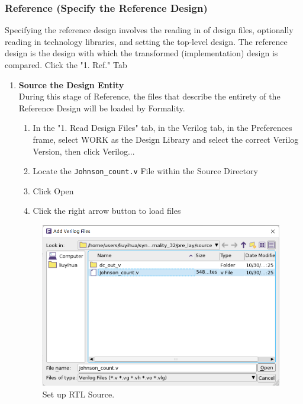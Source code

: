 \documentclass[a4paper,12pt,twoside]{article}
\begin{document}
\subsubsection{Reference (Specify the Reference Design)}
Specifying the reference design involves the reading in of design files, optionally reading in technology libraries, and setting the top-level design. The reference design is the design with which the transformed (implementation) design is compared. Click the "1. Ref." Tab
\begin{enumerate}
    \item \textbf{Source the Design Entity}\\
    During this stage of Reference, the files that describe the entirety of the Reference Design will be loaded by Formality.
    \begin{enumerate}
        \item In the "1. Read Design Files" tab, in the Verilog tab, in the Preferences frame, select WORK as the Design Library and select the correct Verilog Version, then click Verilog...
        \item Locate the \texttt{Johnson\_count.v} File within the Source Directory
        \item Click Open
        \item Click the right arrow button to load files
    \end{enumerate}
    \begin{figure}[H]
        \centering
        \includegraphics[width=\textwidth]{images/42.png}
        \caption{Set up RTL Source.}
    \end{figure}
    \begin{verbatim}

\end{verbatim}
\end{enumerate}
\end{document}
